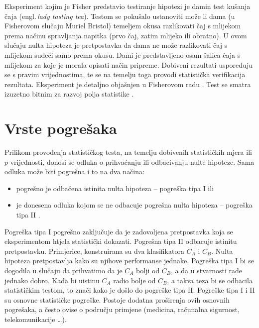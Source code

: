 Eksperiment kojim je Fisher predstavio testiranje hipotezi je damin test kušanja čaja (engl.\,\textit{lady tasting tea}). Testom se pokušalo ustanoviti može li dama (u Fisherovom slučaju Muriel Bristol) temeljem okusa razlikovati čaj s mlijekom prema načinu spravljanja napitka (prvo čaj, zatim mlijeko ili obratno). U ovom slučaju nulta hipoteza je pretpostavka da dama ne može razlikovati čaj s mlijekom sudeći samo prema okusu. Dami je predstavljeno osam šalica čaja s mlijekom za koje je morala opisati način pripreme. Dobiveni rezultati uspoređuju se s pravim vrijednostima, te se na temelju toga provodi statistička verifikacija rezultata. Eksperiment je detaljno objašnjen u Fisherovom radu \cite{fisher1935design}. Test se smatra izuzetno bitnim za razvoj polja statistike \citep{potter2001lady}.

\section{Vrste pogrešaka}

Prilikom provođenja statističkog testa, na temelju dobivenih statističkih mjera ili $p$-vrijednosti, donosi se odluka o prihvaćanju ili odbacivanju nulte hipoteze. Sama odluka može biti pogrešna i to na dva načina:
\begin{itemize}
\item pogrešno je odbačena istinita nulta hipoteza -- pogreška tipa I  ili 
\item je donesena odluka kojom se ne odbacuje pogrešna nulta hipoteza -- pogreška tipa II .
\end{itemize}

Pogreška tipa I pogrešno zaključuje da je zadovoljena pretpostavka koja se eksperimentom htjela statistički dokazati. Pogrešna tipa II odbacuje istinitu pretpostavku. Primjerice, konstruirana su dva klasifikatora $C_A$ i $C_B$. Nulta hipoteza pretpostavlja kako su njihove performanse jednake. Pogreška tipa I bi se dogodila u slučaju da prihvatimo da je $C_A$ bolji od $C_B$, a da u stvarnosti rade jednako dobro. Kada bi uistinu $C_A$ radio bolje od $C_B$, a takva teza bi se odbacila statističkim testom, to znači kako je došlo do pogreške tipa II. Pogreške tipa I i II su osnovne statističke pogreške. Postoje dodatna proširenja ovih osnovnih pogrešaka, a često ovise o području primjene (medicina, računalna sigurnost, telekomunikacije \dots).

